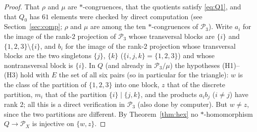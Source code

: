 \documentclass[11pt]{amsart}
\theoremstyle{definition}
\renewcommand{\P}{\mathcal{P}}
\begin{document}
\begin{proof}
That $\rho$ and $\mu$ are $*$-congruences, that the quotients satisfy \eqref{eq:Q1}, and that $Q_0$ has $61$ elements were checked by direct computation (see Section~\ref{sec:comp}; $\rho$ and $\mu$ are among the ten $*$-congruences of $\P_3$). Write $a_i$ for the image of the rank-$2$ projection of $\P_3$ whose transversal blocks are $\{i\}$ and $\{1,2,3\}\setminus\{i\}$, and $b_i$ for the image of the rank-$2$ projection whose transversal blocks are the two singletons $\{j\}$, $\{k\}$ ($\{i,j,k\}=\{1,2,3\}$) and whose nontransversal block is $\{i\}$. In $Q$ (and already in $\P_3/\mu$) the hypotheses (H1)--(H3) hold with $E$ the set of all six pairs (so in particular for the triangle): $w$ is the class of the partition of $\{1,2,3\}$ into one block, $z$ that of the discrete partition, $m_i$ that of the partition $\{i\}\mid\{j,k\}$, and the products $a_ib_j$ ($i\ne j$) have rank $2$; all this is a direct verification in $\P_3$ (also done by computer). But $w\ne z$, since the two partitions are different. By Theorem~\ref{thm:hex} no $*$-homomorphism $Q\to\P_X$ is injective on $\{w,z\}$.
\end{proof}
\end{document}
